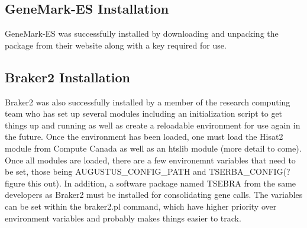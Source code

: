 \subsection{GeneMark-ES Installation}
GeneMark-ES was successfully installed by downloading and unpacking
the package from their website along with a key required for use.

\subsection{Braker2 Installation}
Braker2 was also successfully installed by a member of the research
computing team who has set up several modules including an
initialization script to get things up and running as well as create a
reloadable environment for use again in the future. Once the
environment has been loaded, one must load the Hisat2 module from
Compute Canada as well as an htslib module (more detail to come). Once
all modules are loaded, there are a few environemnt variables that
need to be set, those being AUGUSTUS\_CONFIG\_PATH and
TSERBA\_CONFIG(?figure this out). In addition, a software package named
TSEBRA from the same developers as Braker2 must be installed for
consolidating gene calls. The variables can be set within the
braker2.pl command, which have higher priority over environment
variables and probably makes things easier to track.
